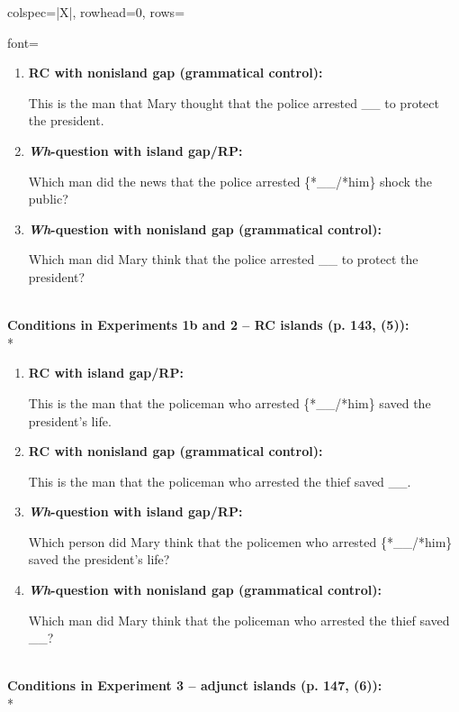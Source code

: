 \begin{longtblr}[caption={\textcite{heestand.etal2011}: Acceptability judgment tasks}, label={tblr:heestand}]{colspec={|X|}, rowhead=0, rows={font=\raggedright{}}}
\begin{varwidth}{\linewidth}
\begin{enumerate}[\bfseries (a),itemsep=5pt]
\item \textbf{RC with nonisland gap (grammatical control):}\par\nobreak
This is the man that Mary thought that the police arrested \_\_ to protect the president.
\item \textbf{\textit{Wh}-question with island gap/RP:}\par\nobreak
Which man did the news that the police arrested \{*\_\_/*him\} shock the public? 
\item \textbf{\textit{Wh}-question with nonisland gap (grammatical control):}\par\nobreak
Which man did Mary think that the police arrested \_\_ to protect the president? 
\end{enumerate}\end{varwidth}\vspace{5pt}\\
\textbf{Conditions in Experiments 1b and 2 -- RC islands (p. 143, (5)):} \vspace{5pt}\\*
\begin{varwidth}{\linewidth}\begin{enumerate}[\bfseries (a),itemsep=5pt] 
\item \textbf{RC with island gap/RP:}\par\nobreak
This is the man that the policeman who arrested \{*\_\_/*him\} saved the president's life.
\item \textbf{RC with nonisland gap (grammatical control):}\par\nobreak
This is the man that the policeman who arrested the thief saved \_\_.
\item \textbf{\textit{Wh}-question with island gap/RP:}\par\nobreak
Which person did Mary think that the policemen who arrested \{*\_\_/*him\} saved the president's life? 
\item \textbf{\textit{Wh}-question with nonisland gap (grammatical control):}\par\nobreak
Which man did Mary think that the policeman who arrested the thief saved \_\_? 
\end{enumerate}\end{varwidth}\vspace{5pt}\\
\textbf{Conditions in Experiment 3 -- adjunct islands (p. 147, (6)):} \vspace{5pt}\\*
\begin{varwidth}{\linewidth}\begin{enumerate}[\bfseries (a),itemsep=5pt] 

\end{enumerate}
\end{varwidth}
\end{longtblr}
